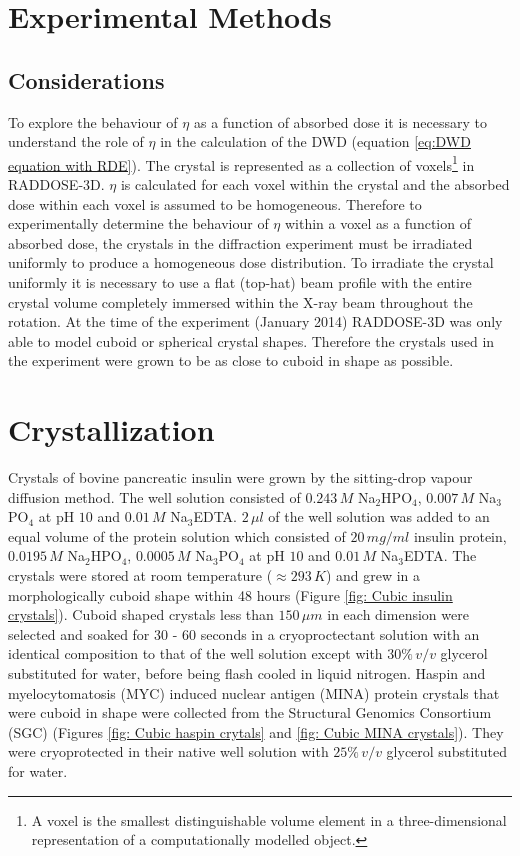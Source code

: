 \section{Experimental Methods}
\label{sec:Experimental Methods}

\subsection{Considerations}
\label{sub:Considerations}
To explore the behaviour of $\eta$ as a function of absorbed dose it is necessary to understand the role of $\eta$ in the calculation of the DWD (equation \ref{eq:DWD equation with RDE}).
The crystal is represented as a collection of voxels\footnote{A voxel is the smallest distinguishable volume element in a three-dimensional representation of a computationally modelled object.} in RADDOSE-3D.
$\eta$ is calculated for each voxel within the crystal and the absorbed dose within each voxel is assumed to be homogeneous.
Therefore to experimentally determine the behaviour of $\eta$ within a voxel as a function of absorbed dose, the crystals in the diffraction experiment must be irradiated uniformly to produce a homogeneous dose distribution.
To irradiate the crystal uniformly it is necessary to use a flat (top-hat) beam profile with the entire crystal volume completely immersed within the X-ray beam throughout the rotation.
At the time of the experiment (January 2014) RADDOSE-3D was only able to model cuboid or spherical crystal shapes.
Therefore the crystals used in the experiment were grown to be as close to cuboid in shape as possible.

\section{Crystallization}
\label{seccrystallisation}
Crystals of bovine pancreatic insulin were grown by the sitting-drop vapour diffusion method.
The well solution consisted of $0.243\, M$ Na$_2$HPO$_4$, $0.007\, M$ Na$_3$PO$_4$ at pH $10$ and $0.01\, M$ Na$_3$EDTA.
$2\, \mu l$ of the well solution was added to an equal volume of the protein solution which consisted of $20\, mg/ml$ insulin protein, $0.0195\, M$ Na$_2$HPO$_4$, $0.0005\, M$ Na$_3$PO$_4$ at pH $10$ and $0.01\, M$ Na$_3$EDTA.
The crystals were stored at room temperature ($\approx 293\, K$) and grew in a morphologically cuboid shape within 48 hours (Figure \ref{fig: Cubic insulin crystals}).
Cuboid shaped crystals less than $150\, \mu m$ in each dimension were selected and soaked for 30 - 60 seconds in a cryoproctectant solution with an identical composition to that of the well solution except with $30\%\, v/v$ glycerol substituted for water, before being flash cooled in liquid nitrogen.
\newline
Haspin and myelocytomatosis (MYC) induced nuclear antigen (MINA) protein crystals that were cuboid in shape were collected from the Structural Genomics Consortium (SGC) (Figures \ref{fig: Cubic haspin crytals} and \ref{fig: Cubic MINA crystals}).
They were cryoprotected in their native well solution with $25\%\, v/v$ glycerol substituted for water.


